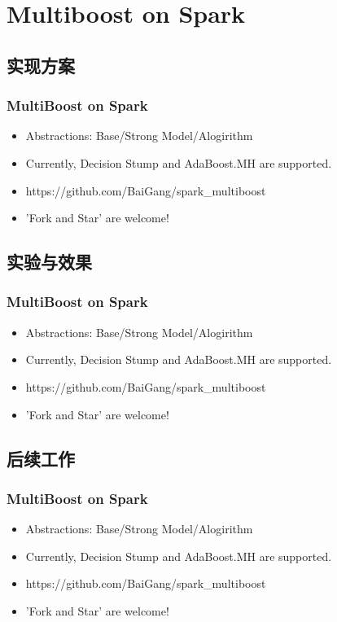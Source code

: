 \documentclass{beamer}
\begin{document}

\section{Multiboost on Spark}

\subsection{实现方案}

\begin{frame}
\frametitle{MultiBoost on Spark}
\begin{itemize}
\item Abstractions: Base/Strong Model/Alogirithm
\item Currently, Decision Stump and AdaBoost.MH are supported.
\item https://github.com/BaiGang/spark\_multiboost
\item 'Fork and Star' are welcome!
\end{itemize}
\end{frame}

\subsection{实验与效果}

\begin{frame}
\frametitle{MultiBoost on Spark}
\begin{itemize}
\item Abstractions: Base/Strong Model/Alogirithm
\item Currently, Decision Stump and AdaBoost.MH are supported.
\item https://github.com/BaiGang/spark\_multiboost
\item 'Fork and Star' are welcome!
\end{itemize}
\end{frame}

\subsection{后续工作}

\begin{frame}
\frametitle{MultiBoost on Spark}
\begin{itemize}
\item Abstractions: Base/Strong Model/Alogirithm
\item Currently, Decision Stump and AdaBoost.MH are supported.
\item https://github.com/BaiGang/spark\_multiboost
\item 'Fork and Star' are welcome!
\end{itemize}
\end{frame}
\end{document}
